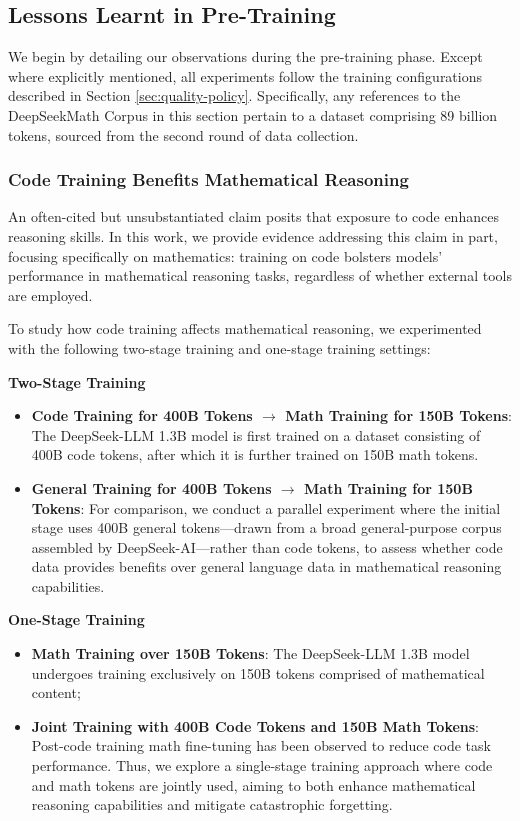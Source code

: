\begin{itemize}[topsep=0pt]
\begin{itemize}[topsep=0pt]
\subsection{Lessons Learnt in Pre-Training}

We begin by detailing our observations during the pre-training phase. Except where explicitly mentioned, all experiments follow the training configurations described in Section \ref{sec:quality-policy}. Specifically, any references to the DeepSeekMath Corpus in this section pertain to a dataset comprising 89 billion tokens, sourced from the second round of data collection.

\subsubsection{Code Training Benefits Mathematical Reasoning}

An often-cited but unsubstantiated claim posits that exposure to code enhances reasoning skills. In this work, we provide evidence addressing this claim in part, focusing specifically on mathematics: training on code bolsters models' performance in mathematical reasoning tasks, regardless of whether external tools are employed.

To study how code training affects mathematical reasoning, we experimented with the following two-stage training and one-stage training settings:

\textbf{Two-Stage Training}

\begin{itemize}[topsep=0pt]
    \item \textbf{Code Training for 400B Tokens $\rightarrow$ Math Training for 150B Tokens}: The DeepSeek-LLM 1.3B model is first trained on a dataset consisting of 400B code tokens, after which it is further trained on 150B math tokens.
    \item \textbf{General Training for 400B Tokens $\rightarrow$ Math Training for 150B Tokens}: For comparison, we conduct a parallel experiment where the initial stage uses 400B general tokens—drawn from a broad general-purpose corpus assembled by DeepSeek-AI—rather than code tokens, to assess whether code data provides benefits over general language data in mathematical reasoning capabilities.
\end{itemize}

\textbf{One-Stage Training}

\begin{itemize}[topsep=0pt]
    \item \textbf{Math Training over 150B Tokens}: The DeepSeek-LLM 1.3B model undergoes training exclusively on 150B tokens comprised of mathematical content;
    \item \textbf{Joint Training with 400B Code Tokens and 150B Math Tokens}: Post-code training math fine-tuning has been observed to reduce code task performance. Thus, we explore a single-stage training approach where code and math tokens are jointly used, aiming to both enhance mathematical reasoning capabilities and mitigate catastrophic forgetting.
\end{itemize}


\end{itemize}
\end{itemize}
